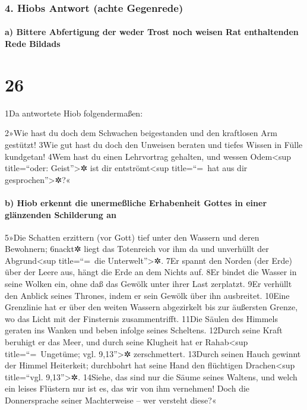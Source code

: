 \hypertarget{hiobs-antwort-achte-gegenrede}{%
\subsubsection{4. Hiobs Antwort (achte
Gegenrede)}\label{hiobs-antwort-achte-gegenrede}}

\hypertarget{a-bittere-abfertigung-der-weder-trost-noch-weisen-rat-enthaltenden-rede-bildads}{%
\paragraph{a) Bittere Abfertigung der weder Trost noch weisen Rat
enthaltenden Rede
Bildads}\label{a-bittere-abfertigung-der-weder-trost-noch-weisen-rat-enthaltenden-rede-bildads}}

\hypertarget{section-25}{%
\section{26}\label{section-25}}

1Da antwortete Hiob folgendermaßen:

2»Wie hast du doch dem Schwachen beigestanden und den kraftlosen Arm
gestützt! 3Wie gut hast du doch den Unweisen beraten und tiefes Wissen
in Fülle kundgetan! 4Wem hast du einen Lehrvortrag gehalten, und wessen
Odem\textless sup title=``oder: Geist''\textgreater✲ ist dir
entströmt\textless sup title=``=~hat aus dir gesprochen''\textgreater✲?«

\hypertarget{b-hiob-erkennt-die-unermeuxdfliche-erhabenheit-gottes-in-einer-gluxe4nzenden-schilderung-an}{%
\paragraph{b) Hiob erkennt die unermeßliche Erhabenheit Gottes in einer
glänzenden Schilderung
an}\label{b-hiob-erkennt-die-unermeuxdfliche-erhabenheit-gottes-in-einer-gluxe4nzenden-schilderung-an}}

5»Die Schatten erzittern (vor Gott) tief unter den Wassern und deren
Bewohnern; 6nackt✲ liegt das Totenreich vor ihm da und unverhüllt der
Abgrund\textless sup title=``=~die Unterwelt''\textgreater✲. 7Er spannt
den Norden (der Erde) über der Leere aus, hängt die Erde an dem Nichts
auf. 8Er bindet die Wasser in seine Wolken ein, ohne daß das Gewölk
unter ihrer Last zerplatzt. 9Er verhüllt den Anblick seines Thrones,
indem er sein Gewölk über ihn ausbreitet. 10Eine Grenzlinie hat er über
den weiten Wassern abgezirkelt bis zur äußersten Grenze, wo das Licht
mit der Finsternis zusammentrifft. 11Die Säulen des Himmels geraten ins
Wanken und beben infolge seines Scheltens. 12Durch seine Kraft beruhigt
er das Meer, und durch seine Klugheit hat er Rahab\textless sup
title=``=~Ungetüme; vgl. 9,13''\textgreater✲ zerschmettert. 13Durch
seinen Hauch gewinnt der Himmel Heiterkeit; durchbohrt hat seine Hand
den flüchtigen Drachen\textless sup title=``vgl. 9,13''\textgreater✲.
14Siehe, das sind nur die Säume seines Waltens, und welch ein leises
Flüstern nur ist es, das wir von ihm vernehmen! Doch die Donnersprache
seiner Machterweise -- wer versteht diese?«

